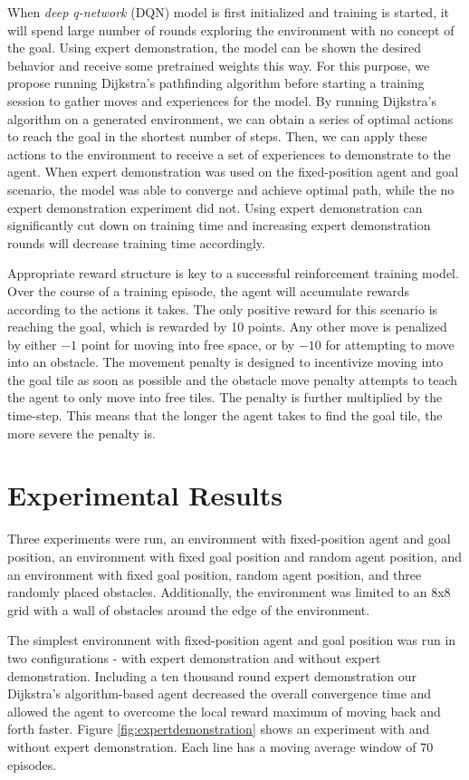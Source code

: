 \documentclass[conference]{IEEEtran}
\begin{document}
When \textit{deep q-network} (DQN) model is first initialized and training is
started, it will spend large number of rounds exploring the environment with no
concept of the goal. Using expert demonstration, the model can be shown the
desired behavior and receive some pretrained weights this way. For this purpose,
we propose running Dijkstra's pathfinding algorithm before starting a training
session to gather moves and experiences for the model. By running Dijkstra's
algorithm on a generated environment, we can obtain a series of optimal actions
to reach the goal in the shortest number of steps. Then, we can apply these
actions to the environment to receive a set of experiences to demonstrate to the
agent. When expert demonstration was used on the fixed-position agent and goal
scenario, the model was able to converge and achieve optimal path, while the no
expert demonstration experiment did not. Using expert demonstration can
significantly cut down on training time and increasing expert demonstration
rounds will decrease training time accordingly.

Appropriate reward structure is key to a successful reinforcement training
model. Over the course of a training episode, the agent will accumulate rewards
according to the actions it takes. The only positive reward for this scenario is
reaching the goal, which is rewarded by 10 points. Any other move is penalized
by either $-1$ point for moving into free space, or by $-10$ for attempting to
move into an obstacle. The movement penalty is designed to incentivize moving
into the goal tile as soon as possible and the obstacle move penalty attempts to
teach the agent to only move into free tiles. The penalty is further multiplied
by the time-step. This means that the longer the agent takes to find the goal
tile, the more severe the penalty is.

\FloatBarrier
\section{Experimental Results}
Three experiments were run, an environment with fixed-position agent and goal
position, an environment with fixed goal position and random agent position, and
an environment with fixed goal position, random agent position, and three
randomly placed obstacles. Additionally, the environment was limited to an 8x8
grid with a wall of obstacles around the edge of the environment.

The simplest environment with fixed-position agent and goal position was run in
two configurations - with expert demonstration and without expert demonstration.
Including a ten thousand round expert demonstration our Dijkstra's
algorithm-based agent decreased the overall convergence time and allowed the
agent to overcome the local reward maximum of moving back and forth faster. Figure
\ref{fig:expertdemonstration} shows an experiment with and without expert
demonstration. Each line has a moving average window of 70 episodes.
\end{document}

